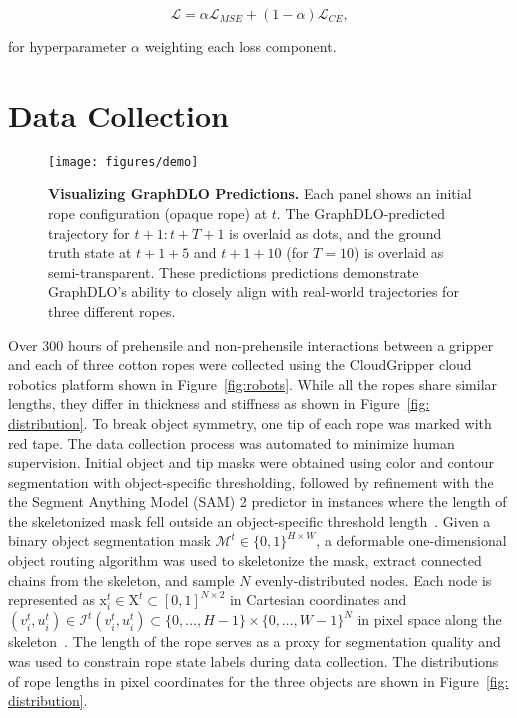 \documentclass[letterpaper, 10 pt, conference]{IEEETran}
\newcommand{\mat}[1]{\bm{\mathrm{#1}}}
\begin{document}
\begin{equation}
    \mathcal{L} = \alpha\mathcal{L}_{MSE} + \left(1-\alpha\right)\mathcal{L}_{CE 
 },
\end{equation}

\noindent for hyperparameter $\alpha$ weighting each loss component.

\section{Data Collection}

\begin{figure*}[t]
\centering
\texttt{[image: figures/demo]}
\caption{\textbf{Visualizing GraphDLO Predictions.}  Each panel shows an initial rope configuration (opaque rope) at $t$. The GraphDLO-predicted trajectory for $t+1:t+T+1$ is overlaid as dots, and the ground truth state at $t+1+5$ and $t+1+10$ (for $T=10$) is overlaid as semi-transparent. These predictions predictions demonstrate GraphDLO’s ability to closely align with real-world trajectories for three different ropes.}
\label{fig: demo}
\end{figure*}


Over 300 hours of prehensile and non-prehensile interactions between a gripper and each of three cotton ropes were collected using the CloudGripper cloud robotics platform shown in Figure~\ref{fig:robots}. While all the ropes share similar lengths, they differ in thickness and stiffness as shown in Figure~\ref{fig: distribution}. To break object symmetry, one tip of each rope was marked with red tape. The data collection process was automated to minimize human supervision. Initial object and tip masks were obtained using color and contour segmentation with object-specific thresholding, followed by refinement with the the Segment Anything Model (SAM) 2 predictor in instances where the length of the skeletonized mask fell outside an object-specific threshold length~\cite{ravi2024sam}. Given a binary object segmentation mask $\mathcal{M}^t \in \{0, 1\}^{H \times W}$, a deformable one-dimensional object routing algorithm was used to skeletonize the mask, extract connected chains from the skeleton, and sample $N$ evenly-distributed nodes. Each node is represented as $\mat{x}_i^t \in \mat{X}^t \subset \left[0, 1\right]^{N \times 2}$ in Cartesian coordinates and $\left(v_i^t, u_i^t\right) \in \mathcal{I}^t\left(v_i^t, u_i^t\right) \subset \{0, \dots, H - 1\} \times \{0, \dots, W - 1\}^N$ in pixel space along the skeleton~\cite{keipour2022efficient, xiang2023trackdlo}. The length of the rope serves as a proxy for segmentation quality and was used to constrain rope state labels during data collection. The distributions of rope lengths in pixel coordinates for the three objects are shown in Figure~\ref{fig: distribution}. 
\end{document}
